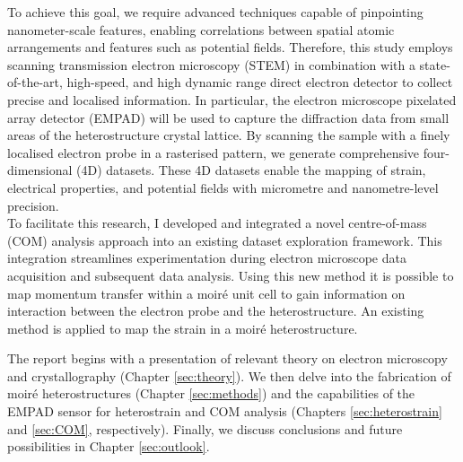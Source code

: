 To achieve this goal, we require advanced techniques capable of pinpointing nanometer-scale features, enabling correlations between spatial atomic arrangements and features such as potential fields. Therefore, this study employs scanning transmission electron microscopy (STEM) in combination with a state-of-the-art, high-speed, and high dynamic range direct electron detector to collect precise and localised information. In particular, the electron microscope pixelated array detector (EMPAD) will be used to capture the diffraction data from small areas of the heterostructure crystal lattice. By scanning the sample with a finely localised electron probe in a rasterised pattern, we generate comprehensive four-dimensional (4D) datasets. These 4D datasets enable the mapping of strain, electrical properties, and potential fields with micrometre and nanometre-level precision.\\

To facilitate this research, I developed and integrated a novel centre-of-mass (COM) analysis approach into an existing dataset exploration framework. This integration streamlines experimentation during electron microscope data acquisition and subsequent data analysis. Using this new method it is possible to map momentum transfer within a moiré unit cell to gain information on interaction between the electron probe and the heterostructure. An existing method is applied to map the strain in a moiré heterostructure.

The report begins with a presentation of relevant theory on electron microscopy and crystallography (Chapter \ref{sec:theory}). We then delve into the fabrication of moir\'e heterostructures (Chapter \ref{sec:methods}) and the capabilities of the EMPAD sensor for heterostrain and COM analysis (Chapters \ref{sec:heterostrain} and \ref{sec:COM}, respectively). Finally, we discuss conclusions and future possibilities in Chapter \ref{sec:outlook}.

